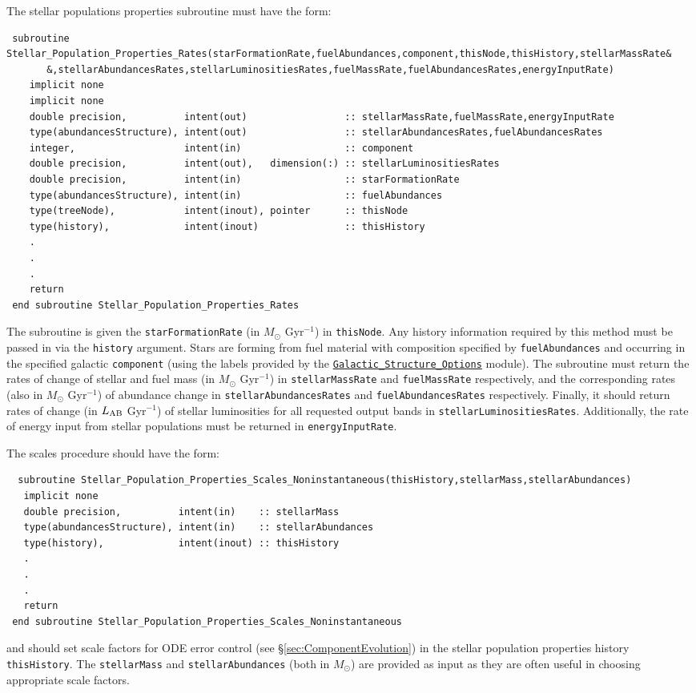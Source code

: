 The stellar populations properties subroutine must have the form:
\begin{verbatim}
 subroutine Stellar_Population_Properties_Rates(starFormationRate,fuelAbundances,component,thisNode,thisHistory,stellarMassRate&
       &,stellarAbundancesRates,stellarLuminositiesRates,fuelMassRate,fuelAbundancesRates,energyInputRate)
    implicit none
    implicit none
    double precision,          intent(out)                 :: stellarMassRate,fuelMassRate,energyInputRate
    type(abundancesStructure), intent(out)                 :: stellarAbundancesRates,fuelAbundancesRates
    integer,                   intent(in)                  :: component
    double precision,          intent(out),   dimension(:) :: stellarLuminositiesRates
    double precision,          intent(in)                  :: starFormationRate
    type(abundancesStructure), intent(in)                  :: fuelAbundances
    type(treeNode),            intent(inout), pointer      :: thisNode
    type(history),             intent(inout)               :: thisHistory
    .
    .
    .
    return
 end subroutine Stellar_Population_Properties_Rates
\end{verbatim}
The subroutine is given the {\tt starFormationRate} (in $M_\odot$ Gyr$^{-1}$) in {\tt thisNode}. Any history information required by this method must be passed in via the {\tt history} argument. Stars are forming from fuel material with composition specified by {\tt fuelAbundances} and occurring in the specified galactic {\tt component} (using the labels provided by the \hyperlink{galactic_structure.options.F90:galactic_structure_options}{{\tt Galactic\_Structure\_Options}} module). The subroutine must return the rates of change of stellar and fuel mass (in $M_\odot$ Gyr$^{-1}$) in {\tt stellarMassRate} and {\tt fuelMassRate} respectively, and the corresponding rates (also in $M_\odot$ Gyr$^{-1}$) of abundance change in {\tt stellarAbundancesRates} and {\tt fuelAbundancesRates} respectively. Finally, it should return rates of change (in $L_{\rm AB}$ Gyr$^{-1}$) of stellar luminosities for all requested output bands in {\tt stellarLuminositiesRates}. Additionally, the rate of energy input from stellar 
populations must be returned in {\tt energyInputRate}.

The scales procedure should have the form:
\begin{verbatim}
  subroutine Stellar_Population_Properties_Scales_Noninstantaneous(thisHistory,stellarMass,stellarAbundances)
   implicit none
   double precision,          intent(in)    :: stellarMass
   type(abundancesStructure), intent(in)    :: stellarAbundances
   type(history),             intent(inout) :: thisHistory
   .
   .
   .
   return
 end subroutine Stellar_Population_Properties_Scales_Noninstantaneous
\end{verbatim}
and should set scale factors for ODE error control (see \S\ref{sec:ComponentEvolution}) in the stellar population properties history {\tt thisHistory}. The {\tt stellarMass} and {\tt stellarAbundances} (both in $M_\odot$) are provided as input as they are often useful in choosing appropriate scale factors.

